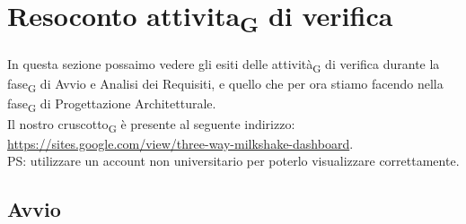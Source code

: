 
\section{Resoconto attivita\textsubscript{G} di verifica}
In questa sezione possaimo vedere gli esiti delle attività\textsubscript{G} di verifica durante la fase\textsubscript{G} di Avvio e Analisi dei Requisiti, e quello che per ora stiamo facendo nella fase\textsubscript{G} di Progettazione Architetturale.\\
Il nostro cruscotto\textsubscript{G} è presente al seguente indirizzo:\\ \url{https://sites.google.com/view/three-way-milkshake-dashboard}.\\PS: utilizzare un account non universitario per poterlo visualizzare correttamente.
\subsection{Avvio}
